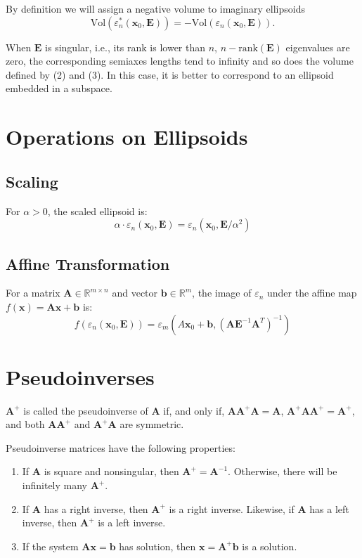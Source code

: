 \documentclass[a4paper,11pt]{article}
\begin{document}
By definition we will assign a negative volume to imaginary ellipsoids
\begin{equation}
\text{Vol}(\varepsilon_n^*(\mathbf{x}_0, \mathbf{E})) = -\text{Vol}(\varepsilon_n(\mathbf{x}_0, \mathbf{E})).
\end{equation}

When $\mathbf{E}$ is singular, i.e., its rank is lower than $n$, $n - \text{rank}(\mathbf{E})$ eigenvalues are zero, the corresponding semiaxes lengths tend to infinity and so does the volume defined by (2) and (3). In this case, it is better to correspond to an ellipsoid embedded in a subspace.

\section{Operations on Ellipsoids}

\subsection{Scaling}
For $\alpha > 0$, the scaled ellipsoid is:
\begin{equation}
\alpha \cdot \varepsilon_n(\mathbf{x}_0, \mathbf{E}) = \varepsilon_n(\mathbf{x}_0, \mathbf{E}/\alpha^2)
\end{equation}

\subsection{Affine Transformation}
For a matrix $\mathbf{A} \in \mathbb{R}^{m \times n}$ and vector $\mathbf{b} \in \mathbb{R}^m$, the image of $\varepsilon_n$ under the affine map $f(\mathbf{x}) = \mathbf{A}\mathbf{x} + \mathbf{b}$ is:
\begin{equation}
f(\varepsilon_n(\mathbf{x}_0, \mathbf{E})) = \varepsilon_m(A\mathbf{x}_0 + \mathbf{b}, (\mathbf{A}\mathbf{E}^{-1}\mathbf{A}^T)^{-1})
\end{equation}

\section{Pseudoinverses}
$\mathbf{A}^+$ is called the pseudoinverse of $\mathbf{A}$ if, and only if, $\mathbf{A}\mathbf{A}^+\mathbf{A} = \mathbf{A}$, $\mathbf{A}^+\mathbf{A}\mathbf{A}^+ = \mathbf{A}^+$, and both $\mathbf{A}\mathbf{A}^+$ and $\mathbf{A}^+\mathbf{A}$ are symmetric.

Pseudoinverse matrices have the following properties:
\begin{enumerate}
\item If $\mathbf{A}$ is square and nonsingular, then $\mathbf{A}^+ = \mathbf{A}^{-1}$. Otherwise, there will be infinitely many $\mathbf{A}^+$.
\item If $\mathbf{A}$ has a right inverse, then $\mathbf{A}^+$ is a right inverse. Likewise, if $\mathbf{A}$ has a left inverse, then $\mathbf{A}^+$ is a left inverse.
\item If the system $\mathbf{A}\mathbf{x} = \mathbf{b}$ has solution, then $\mathbf{x} = \mathbf{A}^+\mathbf{b}$ is a solution.
\end{enumerate}
\end{document}
